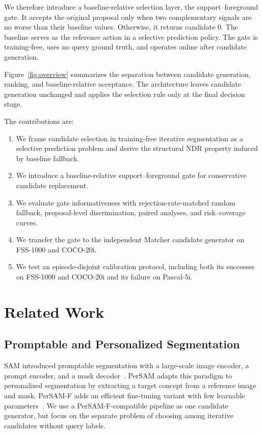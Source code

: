 \documentclass{CVM}
\begin{document}
We therefore introduce a baseline-relative selection layer, the support--foreground gate. It accepts the original proposal only when two complementary signals are no worse than their baseline values. Otherwise, it returns candidate 0. The baseline serves as the reference action in a selective prediction policy. The gate is training-free, uses no query ground truth, and operates online after candidate generation.

Figure~\ref{fig:overview} summarizes the separation between candidate generation, ranking, and baseline-relative acceptance. The architecture leaves candidate generation unchanged and applies the selection rule only at the final decision stage.

The contributions are:

\begin{enumerate}
\item We frame candidate selection in training-free iterative segmentation as a selective prediction problem and derive the structural NDR property induced by baseline fallback.
\item We introduce a baseline-relative support--foreground gate for conservative candidate replacement.
\item We evaluate gate informativeness with rejection-rate-matched random fallback, proposal-level discrimination, paired analyses, and risk--coverage curves.
\item We transfer the gate to the independent Matcher candidate generator on FSS-1000 and COCO-20i.
\item We test an episode-disjoint calibration protocol, including both its successes on FSS-1000 and COCO-20i and its failure on Pascal-5i.
\end{enumerate}

\section{Related Work}

\subsection{Promptable and Personalized Segmentation}

SAM introduced promptable segmentation with a large-scale image encoder, a prompt encoder, and a mask decoder~\cite{1}. PerSAM adapts this paradigm to personalized segmentation by extracting a target concept from a reference image and mask. PerSAM-F adds an efficient fine-tuning variant with few learnable parameters~\cite{2}. We use a PerSAM-F-compatible pipeline as one candidate generator, but focus on the separate problem of choosing among iterative candidates without query labels.
\end{document}
